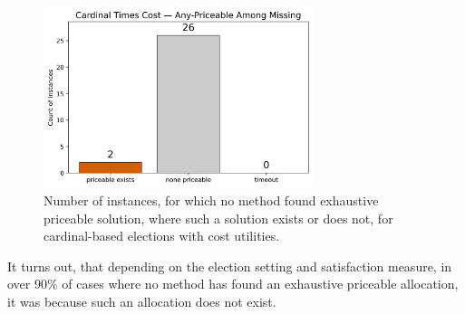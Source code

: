 \begin{figure}[H]         
  \centering              
  \includegraphics[width=0.7\textwidth]{figures/plots/cardinal-times-cost/cardinal_times_cost_any_priceable.png}
  \caption{Number of instances, for which no method found exhaustive priceable solution, where such a solution exists or does not, for cardinal-based elections with cost utilities.}
  \label{fig:myplot}
\end{figure}
It turns out, that depending on the election setting and satisfaction measure, in over $90\%$ of cases where no method has found an exhaustive priceable allocation, it was because such an allocation does not exist.

